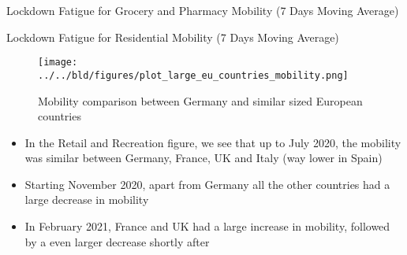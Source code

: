 \documentclass[11pt, a4paper, leqno]{article}
\begin{document}
\newpage

\begin{table}
	\centering
	\caption{Lockdown Fatigue for Grocery and Pharmacy Mobility (7 Days Moving Average)}
	\scalebox{0.8}{%
		
	}
\end{table}

\newpage

\begin{table}
	\centering
	\caption{Lockdown Fatigue for Residential Mobility (7 Days Moving Average)}
	\scalebox{0.8}{%
		
	}
\end{table}

\newpage
\begin{figure}
	\centering
	\caption{Mobility comparison between Germany and similar sized European countries}
	\texttt{[image: ../../bld/figures/plot\_large\_eu\_countries\_mobility.png]}
\end{figure}

\begin{itemize}
	\item In the Retail and Recreation figure, we see that up to July 2020, the mobility was similar between Germany, France, UK and Italy (way lower in Spain)
	\item Starting November 2020, apart from Germany all the other countries had a large decrease in mobility
	\item In February 2021, France and UK had a large increase in mobility, followed by a even larger decrease shortly after
\end{itemize}



\clearpage

\printbibliography
{}





\end{document}
